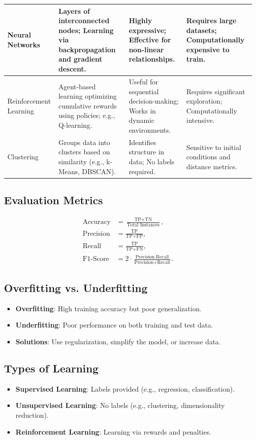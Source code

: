 \documentclass[10pt,a4paper]{article}
\begin{document}
\begin{longtable}{|p{3cm}|p{5cm}|p{5cm}|p{3cm}|}
Neural Networks & Layers of interconnected nodes; Learning via backpropagation and gradient descent. & Highly expressive; Effective for non-linear relationships. & Requires large datasets; Computationally expensive to train. \\
\hline

Reinforcement Learning & Agent-based learning optimizing cumulative rewards using policies; e.g., Q-learning. & Useful for sequential decision-making; Works in dynamic environments. & Requires significant exploration; Computationally intensive. \\
\hline

Clustering & Groups data into clusters based on similarity (e.g., k-Means, DBSCAN). & Identifies structure in data; No labels required. & Sensitive to initial conditions and distance metrics. \\
\hline

\end{longtable}

\subsection*{Evaluation Metrics}
\begin{align*}
    \text{Accuracy} &= \frac{\text{TP} + \text{TN}}{\text{Total Instances}}, \\
    \text{Precision} &= \frac{\text{TP}}{\text{TP} + \text{FP}}, \\
    \text{Recall} &= \frac{\text{TP}}{\text{TP} + \text{FN}}, \\
    \text{F1-Score} &= 2 \cdot \frac{\text{Precision} \cdot \text{Recall}}{\text{Precision} + \text{Recall}}.
\end{align*}

\subsection*{Overfitting vs. Underfitting}
\begin{itemize}
    \item \textbf{Overfitting}: High training accuracy but poor generalization.
    \item \textbf{Underfitting}: Poor performance on both training and test data.
    \item \textbf{Solutions}: Use regularization, simplify the model, or increase data.
\end{itemize}

\subsection*{Types of Learning}
\begin{itemize}
    \item \textbf{Supervised Learning}: Labels provided (e.g., regression, classification).
    \item \textbf{Unsupervised Learning}: No labels (e.g., clustering, dimensionality reduction).
    \item \textbf{Reinforcement Learning}: Learning via rewards and penalties.
\end{itemize}
\end{document}
